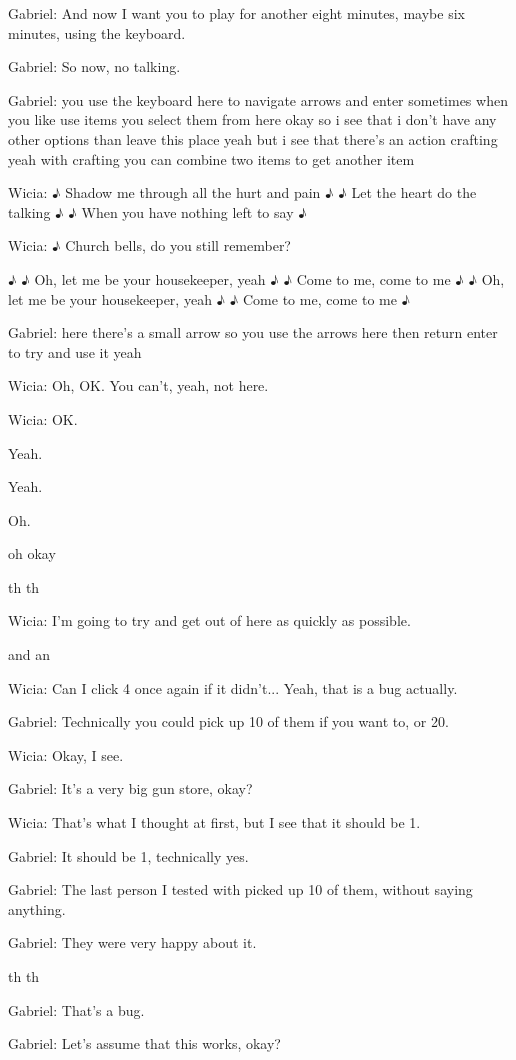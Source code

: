 Gabriel: And now I want you to play for another eight minutes, maybe six minutes, using the keyboard.

Gabriel: So now, no talking.

Gabriel: you use the keyboard here to navigate arrows and enter sometimes when you like use items you select them from here okay so i see that i don't have any other options than leave this place yeah but i see that there's an action crafting yeah with crafting you can combine two items to get another item

Wicia: ♪ Shadow me through all the hurt and pain ♪ ♪ Let the heart do the talking ♪ ♪ When you have nothing left to say ♪

Wicia: ♪ Church bells, do you still remember?

♪ ♪ Oh, let me be your housekeeper, yeah ♪ ♪ Come to me, come to me ♪ ♪ Oh, let me be your housekeeper, yeah ♪ ♪ Come to me, come to me ♪

Gabriel: here there's a small arrow so you use the arrows here then return enter to try and use it yeah

Wicia: Oh, OK. You can't, yeah, not here.

Wicia: OK.

Yeah.

Yeah.

Oh.

oh okay

th th

Wicia: I'm going to try and get out of here as quickly as possible.

and an

Wicia: Can I click 4 once again if it didn't... Yeah, that is a bug actually.

Gabriel: Technically you could pick up 10 of them if you want to, or 20.

Wicia: Okay, I see.

Gabriel: It's a very big gun store, okay?

Wicia: That's what I thought at first, but I see that it should be 1.

Gabriel: It should be 1, technically yes.

Gabriel: The last person I tested with picked up 10 of them, without saying anything.

Gabriel: They were very happy about it.

th th

Gabriel: That's a bug.

Gabriel: Let's assume that this works, okay?


